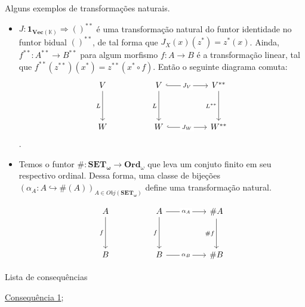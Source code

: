 \begin{ex}
	Alguns exemplos de transformações naturais.
 
    \begin{itemize}
        \item $J:\mathbf{1_{\mathbf{Vec(\mathbb{K})}}} \Longrightarrow ()^{**} $ é uma transformação natural do funtor identidade no funtor bidual $()^{**}$, de tal forma que $J_X(x)(z^*) = z^*(x)$. Ainda, $f^{**}: A^{**} \longrightarrow B^{**}$ para algum morfismo $f: A \longrightarrow B$ é a transformação linear, tal que $f^{**}(z^{**})(x^*) = z^{**}(x^{*} \circ f)$. Então o seguinte diagrama comuta:
\[\begin{tikzcd}
	V && V && {V^{**}} \\
	\\
	W && W && {W^{**}}
	\arrow["L"', from=1-1, to=3-1]
	\arrow["{J_V}"{description}, hook, from=1-3, to=1-5]
	\arrow["L"', from=1-3, to=3-3]
	\arrow["{L^{**}}"', from=1-5, to=3-5]
	\arrow["{J_W}"{description}, hook, from=3-3, to=3-5]
\end{tikzcd}\].

\item Temos o funtor $\#: \mathbf{SET_\omega} \longrightarrow \mathbf{Ord}_\omega$ que leva um conjuto finito em seu respectivo ordinal. Dessa forma, uma classe de bijeções $(\alpha_A: A \hookrightarrow \#(A))_{A \in Obj(\mathbf{SET_\omega})}$ define uma transformação natural.

\[\begin{tikzcd}
	A && A && {\#A} \\
	\\
	B && B && {\#B}
	\arrow["f"', from=1-1, to=3-1]
	\arrow["{\alpha_A}"{description}, from=1-3, to=1-5]
	\arrow["f"', from=1-3, to=3-3]
	\arrow["{\#f}"', from=1-5, to=3-5]
	\arrow["{\alpha_B}"{description}, from=3-3, to=3-5]
\end{tikzcd}\]


        
    \end{itemize}
\end{ex}


\begin{titlemize}{Lista de consequências}
	\item \hyperref[consequencia1]{Consequência 1};\\ %
	\item \hyperref[]{}
\end{titlemize}
